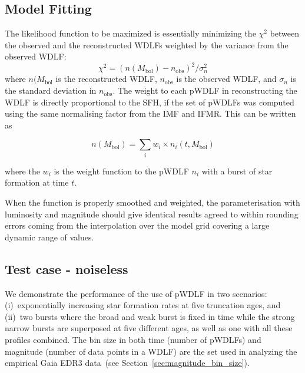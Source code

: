 \documentclass[fleqn,usenatbib]{mnras}
\begin{document}
\subsection{Model Fitting}
\label{sec:model_fitting}
The likelihood function to be maximized is essentially minimizing the $\chi^2$
between the observed and the reconstructed WDLFs weighted by the variance from
the observed WDLF:
\begin{equation}
\chi^2 = \left(n(M_\mathrm{bol}) - n_\mathrm{obs}\right)^2 / \sigma_n^2
\end{equation}
where $n(M_\mathrm{bol}$ is the reconstructed WDLF, $n_\mathrm{obs}$ is the
observed WDLF, and $\sigma_n$ is the standard deviation in $n_\mathrm{obs}$.
The weight to each pWDLF in reconstructing the WDLF is directly proportional to
the SFH, if the set of pWDLFs was computed using the same normalising factor
from the IMF and IFMR. This can be written as

\begin{equation}
    n(M_\mathrm{bol}) = \sum_i w_i \times n_i(t, M_\mathrm{bol})    
\end{equation}

where the $w_i$ is the weight function to the pWDLF $n_i$ with a burst of star
formation at time $t$.

When the function is properly smoothed and weighted, the parameterisation with
luminosity and magnitude should give identical results agreed to within
rounding errors coming from the interpolation over the model grid covering a
large dynamic range of values.

\subsection{Test case - noiseless}

We demonstrate the performance of the use of pWDLF in two scenarios:
(i)~exponentially increasing star formation rates at five truncation ages, and
(ii)~two bursts where the broad and weak burst is fixed in time while the strong
narrow bursts are superposed at five different ages, as well as one with all
these profiles combined. The bin size in both time (number of pWDLFs) and
magnitude (number of data points in a WDLF) are the set used in analyzing the
empirical Gaia EDR3 data~(see Section~\ref{sec:magnitude_bin_size}).

\end{document}
